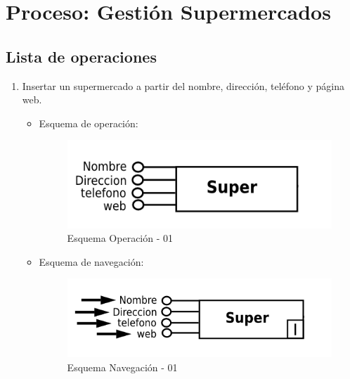 \documentclass[a4paper,12pt]{report}
\begin{document}
\section{Proceso: Gestión Supermercados}
\label{sec-7-3}
\subsection{Lista de operaciones}
\label{sec-7-3-1}
\begin{enumerate}
\item Insertar un supermercado a partir del nombre, dirección,
teléfono y página web.
\begin{itemize}
\item Esquema de operación:
\begin{figure}[!htp]
\centering
\includegraphics[width=0.9\linewidth]{./operaciones/img/Super/01_ope.png}
\caption{Esquema Operación - 01}
\label{fig:ope01}
\medskip
\footnotesize
{}
\end{figure}
\item Esquema de navegación:
\begin{figure}[!htp]
\centering
\includegraphics[width=0.9\linewidth]{./operaciones/img/Super/01_nav.png}
\caption{Esquema Navegación - 01}
\label{fig:nave01}
\medskip
\footnotesize
{}
\end{figure}
\end{itemize}


\end{enumerate}
\end{document}
